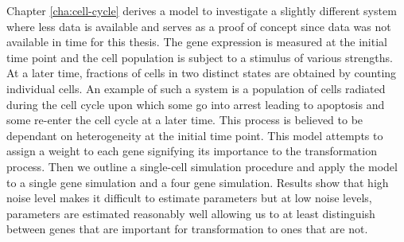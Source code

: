 Chapter \ref{cha:cell-cycle} derives a model to investigate a slightly different system where less data is available and serves as a proof of concept since data was not available in time for this thesis. The gene expression is measured at the initial time point and the cell population is subject to a stimulus of various strengths. At a later time, fractions of cells in two distinct states are obtained by counting individual cells. An example of such a system is a population of cells radiated during the cell cycle upon which some go into arrest leading to apoptosis and some re-enter the cell cycle at a later time. This process is believed to be dependant on heterogeneity at the initial time point. This model attempts to assign a weight to each gene signifying its importance to the transformation process. Then we outline a single-cell simulation procedure and apply the model to a single gene simulation and a four gene simulation. Results show that high noise level makes it difficult to estimate parameters but at low noise levels, parameters are estimated reasonably well allowing us to at least distinguish between genes that are important for transformation to ones that are not.

